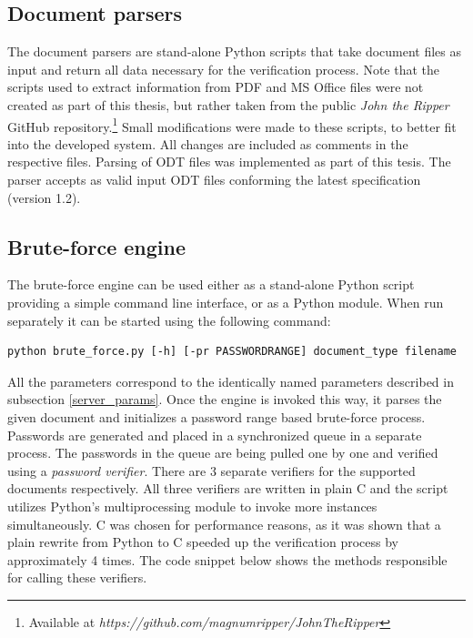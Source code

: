\documentclass[11pt,oneside]{fithesis2}
\begin{document}
\subsection{Document parsers} \label{doc_parsers}

The document parsers are stand-alone Python scripts that take document files as input and return all  data necessary for the verification process. Note that the scripts used to extract information from PDF and MS Office files were not created as part of this thesis, but rather taken from the public \textit{John the Ripper} GitHub repository.\footnote{Available at \textit{https://github.com/magnumripper/JohnTheRipper}} Small modifications were made to these scripts, to better fit into the developed system. All changes are included as comments in the respective files. Parsing of ODT files was implemented as part of this tesis. The parser accepts as valid input ODT files conforming the latest specification (version 1.2).

\subsection{Brute-force engine}\label{brute_force_engine}

The brute-force engine can be used either as a stand-alone Python script providing a simple command line interface, or as a Python module. When run separately it can be started using the following command:

\begin{lstlisting}
python brute_force.py [-h] [-pr PASSWORDRANGE] document_type filename
\end{lstlisting}

All the parameters correspond to the identically named parameters described in subsection \ref{server_params}. Once the engine is invoked this way, it parses the given document and initializes a password range based brute-force process. Passwords are generated and placed in a synchronized queue in a separate process. The passwords in the queue are being pulled one by one and verified using a \textit{password verifier}. There are 3 separate verifiers for the supported documents respectively. All three verifiers are written in plain C and the script utilizes Python's multiprocessing module to invoke more instances simultaneously. C was chosen for performance reasons, as it was shown that a plain rewrite from Python to C speeded up the verification process by approximately 4 times. The code snippet below shows the methods responsible for calling these verifiers.
\end{document}
